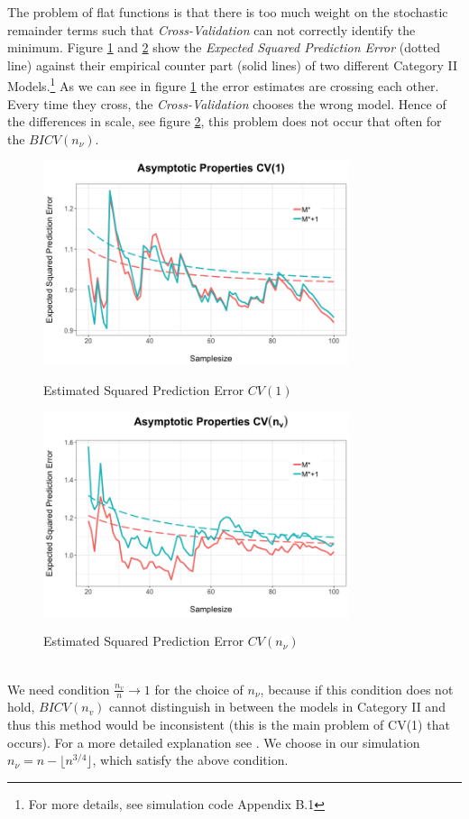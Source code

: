 \documentclass[Research_Module_ES.tex]{subfiles}
\begin{document}
The problem of flat functions is that  there is too much weight on the stochastic remainder terms such that \textit{Cross-Validation} can not correctly identify the minimum. Figure \ref{ProofSketchCV1} and \ref{ProofSektchCVn_v} show the \textit{Expected Squared Prediction Error} (dotted line) against their empirical counter part (solid lines) of two different Category II Models.\footnote{For more details, see simulation code Appendix B.1} As we can see in figure \ref{ProofSketchCV1} the error estimates are crossing each other. Every time they cross, the \textit{Cross-Validation} chooses the wrong model. Hence of the differences in scale, see figure \ref{ProofSektchCVn_v}, this problem does not occur that often for the $BICV(n_\nu)$.\\
\begin{figure}[!h]
	\label{ProofSketchCV1}
	\centering
	\includegraphics[width=0.8\textwidth]{ProofSketchN1.png}\\
	\caption{Estimated Squared Prediction Error $CV(1)$}
\end{figure}
\begin{figure}[!h]
	\label{ProofSektchCVn_v}
	\centering
	\includegraphics[width=0.8\textwidth]{ProofSketchNV.png}\\
	\caption{Estimated Squared Prediction Error $CV(n_\nu)$}
\end{figure}
\\
We need condition $\frac{n_v}{n}\to 1$ for the choice of $n_\nu$, because if this condition does not hold, $BICV(n_v)$ cannot distinguish in between the models in Category II and thus this method would be inconsistent (this is the main problem of CV(1) that occurs). For a more detailed explanation see \cite{shao}. We choose in our simulation $n_\nu=n-\lfloor n^{3/4}\rfloor$, which satisfy the above condition.\\
\end{document}
